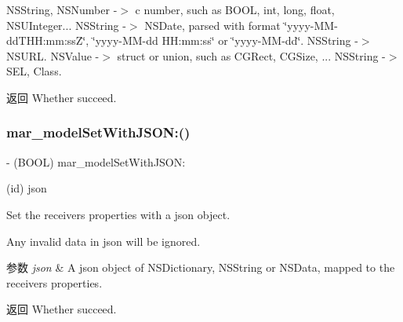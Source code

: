 {\ttfamily N\+S\+String}, {\ttfamily N\+S\+Number} -\/$>$ c number, such as B\+O\+OL, int, long, float, N\+S\+U\+Integer... {\ttfamily N\+S\+String} -\/$>$ N\+S\+Date, parsed with format \char`\"{}yyyy-\/\+M\+M-\/dd\textquotesingle{}\+T\textquotesingle{}\+H\+H\+:mm\+:ss\+Z\char`\"{}, \char`\"{}yyyy-\/\+M\+M-\/dd H\+H\+:mm\+:ss\char`\"{} or \char`\"{}yyyy-\/\+M\+M-\/dd\char`\"{}. {\ttfamily N\+S\+String} -\/$>$ N\+S\+U\+RL. {\ttfamily N\+S\+Value} -\/$>$ struct or union, such as C\+G\+Rect, C\+G\+Size, ... {\ttfamily N\+S\+String} -\/$>$ S\+EL, Class.

\begin{DoxyReturn}{返回}
Whether succeed. 
\end{DoxyReturn}
\mbox{\label{category_n_s_object_07_m_a_r_model_08_a4c2e8b36fb2a53b588010cdff2b42e72}} 
\subsubsection{\texorpdfstring{mar\+\_\+model\+Set\+With\+J\+S\+O\+N\+:()}{mar\_modelSetWithJSON:()}}
{\footnotesize\ttfamily -\/ (B\+O\+OL) mar\+\_\+model\+Set\+With\+J\+S\+O\+N\+: \begin{DoxyParamCaption}\item[{(id)}]{json }\end{DoxyParamCaption}}

Set the receiver\textquotesingle{}s properties with a json object.

Any invalid data in json will be ignored.


\begin{DoxyParams}{参数}
{\em json} & A json object of {\ttfamily N\+S\+Dictionary}, {\ttfamily N\+S\+String} or {\ttfamily N\+S\+Data}, mapped to the receiver\textquotesingle{}s properties.\\
\hline
\end{DoxyParams}
\begin{DoxyReturn}{返回}
Whether succeed. 
\end{DoxyReturn}
\mbox{\label{category_n_s_object_07_m_a_r_model_08_ae7ca0a3a8cca8713083703ab3fb0cf09}} 
